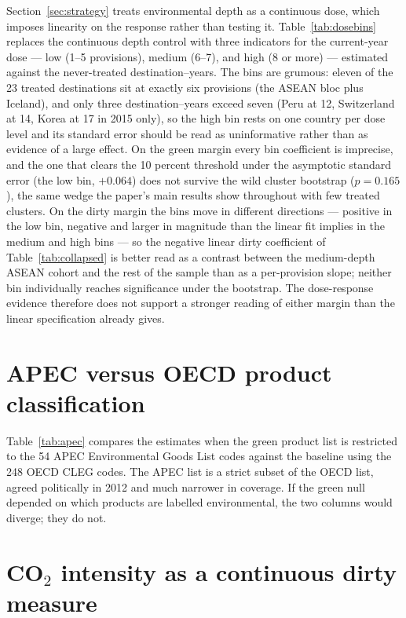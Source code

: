 \documentclass[12pt]{article}
\begin{document}
Section~\ref{sec:strategy} treats environmental depth as a continuous dose, which imposes linearity
on the response rather than testing it. Table~\ref{tab:dosebins} replaces the continuous depth
control with three indicators for the current-year dose --- low (1--5 provisions), medium (6--7),
and high (8 or more) --- estimated against the never-treated destination--years. The bins are
grumous: eleven of the 23 treated destinations sit at exactly six provisions (the ASEAN bloc plus
Iceland), and only three destination--years exceed seven (Peru at 12, Switzerland at 14, Korea at 17
in 2015 only), so the high bin rests on one country per dose level and its standard error should be
read as uninformative rather than as evidence of a large effect. On the green margin every bin
coefficient is imprecise, and the one that clears the 10 percent threshold under the asymptotic
standard error (the low bin, $+0.064$) does not survive the wild cluster bootstrap ($p = 0.165$),
the same wedge the paper's main results show throughout with few treated clusters. On the dirty
margin the bins move in different directions --- positive in the low bin, negative and larger in
magnitude than the linear fit implies in the medium and high bins --- so the negative linear dirty
coefficient of Table~\ref{tab:collapsed} is better read as a contrast between the medium-depth ASEAN
cohort and the rest of the sample than as a per-provision slope; neither bin individually reaches
significance under the bootstrap. The dose-response evidence therefore does not support a stronger
reading of either margin than the linear specification already gives.



\section{APEC versus OECD product classification}\label{app:apec}

Table~\ref{tab:apec} compares the estimates when the green product list is restricted to the 54 APEC Environmental Goods List codes \citep{sauvage2014} against the baseline using the 248 OECD CLEG codes. The APEC list is a strict subset of the OECD list, agreed politically in 2012 and much narrower in coverage. If the green null depended on which products are labelled environmental, the two columns would diverge; they do not.



\section{CO$_2$ intensity as a continuous dirty measure}\label{app:co2}
\end{document}
